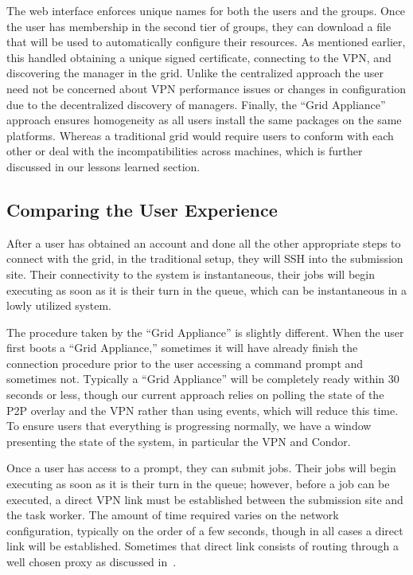 \documentclass[conference]{IEEEtran}
\begin{document}
The web interface enforces unique names for both the users and the groups.
Once the user has membership in the second tier of groups, they can download a
file that will be used to automatically configure their resources.  As
mentioned earlier, this handled obtaining a unique signed certificate,
connecting to the VPN, and discovering the manager in the grid.  Unlike the
centralized approach the user need not be concerned about VPN performance
issues or changes in configuration due to the decentralized discovery of
managers.  Finally, the ``Grid Appliance'' approach ensures homogeneity as all
users install the same packages on the same platforms.  Whereas a traditional
grid would require users to conform with each other or deal with the
incompatibilities across machines, which is further discussed in our lessons
learned section.

\subsection{Comparing the User Experience}

After a user has obtained an account and done all the other appropriate steps
to connect with the grid, in the traditional setup, they will SSH into the
submission site.  Their connectivity to the system is instantaneous, their jobs
will begin executing as soon as it is their turn in the queue, which can be
instantaneous in a lowly utilized system.

The procedure taken by the ``Grid Appliance'' is slightly different.  When the
user first boots a ``Grid Appliance,'' sometimes it will have already finish
the connection procedure prior to the user accessing a command prompt and
sometimes not.  Typically a ``Grid Appliance'' will be completely ready within
30 seconds or less, though our current approach relies on polling the state of
the P2P overlay and the VPN rather than using events, which will reduce this
time.  To ensure users that everything is progressing normally, we have a
window presenting the state of the system, in particular the VPN and Condor.

Once a user has access to a prompt, they can submit jobs.  Their jobs will
begin executing as soon as it is their turn in the queue; however, before a job
can be executed, a direct VPN link must be established between the submission
site and the task worker.  The amount of time required varies on the network
configuration, typically on the order of a few seconds, though in all cases a
direct link will be established.  Sometimes that direct link consists of
routing through a well chosen proxy as discussed in~\cite{groupvpn}.
\end{document}
